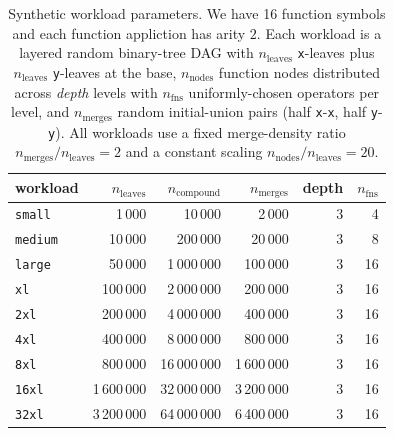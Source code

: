 \begin{table}[t]
  \centering
  \begin{tabular}{l r r r r r}
    \toprule
    workload & $n_{\text{leaves}}$ & $n_{\text{compound}}$ & $n_{\text{merges}}$
    & depth & $n_{\text{fns}}$ \\
    \midrule
    \texttt{small}  &      1\,000 &     10\,000 &      2\,000 & 3 &  4 \\
    \texttt{medium}  &     10\,000 &    200\,000 &     20\,000 & 3 &  8 \\
    \texttt{large}  &     50\,000 &  1\,000\,000 &    100\,000 & 3 & 16 \\
    \texttt{xl}   &    100\,000 &  2\,000\,000 &    200\,000 & 3 & 16 \\
    \texttt{2xl}  &    200\,000 &  4\,000\,000 &    400\,000 & 3 & 16 \\
    \texttt{4xl}  &    400\,000 &  8\,000\,000 &    800\,000 & 3 & 16 \\
    \texttt{8xl}  &    800\,000 & 16\,000\,000 & 1\,600\,000 & 3 & 16 \\
    \texttt{16xl} &  1\,600\,000 & 32\,000\,000 & 3\,200\,000 & 3 & 16 \\
    \texttt{32xl} &  3\,200\,000 & 64\,000\,000 & 6\,400\,000 & 3 & 16 \\
    \bottomrule
  \end{tabular}
  \caption{Synthetic workload parameters. We have 16 function symbols and each
  function appliction has arity $2$. Each workload is a layered random
  binary-tree DAG with $n_{\text{leaves}}$ \texttt{x}-leaves plus
  $n_{\text{leaves}}$ \texttt{y}-leaves at the base, $n_{\text{nodes}}$ function
  nodes distributed across \emph{depth} levels with $n_{\text{fns}}$
  uniformly-chosen operators per level, and $n_{\text{merges}}$ random
  initial-union pairs (half \texttt{x}-\texttt{x}, half \texttt{y}-\texttt{y}).
  All workloads use a fixed merge-density ratio $n_{\text{merges}} /
  n_{\text{leaves}} = 2$ and a constant scaling $n_{\text{nodes}} /
  n_{\text{leaves}} = 20$.}
  \label{tab:workloads}
\end{table}



